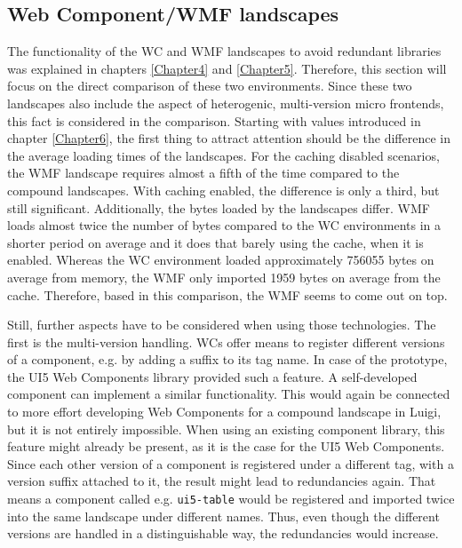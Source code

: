 \subsection{Web Component/WMF landscapes}

The functionality of the WC and WMF landscapes to avoid redundant libraries was explained in chapters \ref{Chapter4} and \ref{Chapter5}. 
Therefore, this section will focus on the direct comparison of these two environments. 
Since these two landscapes also include the aspect of heterogenic, multi-version micro frontends, this fact is considered in the comparison. 
Starting with values introduced in chapter \ref{Chapter6}, the first thing to attract attention should be the difference in the average loading times of the landscapes. 
For the caching disabled scenarios, the WMF landscape requires almost a fifth of the time compared to the compound landscapes. 
With caching enabled, the difference is only a third, but still significant. 
Additionally, the bytes loaded by the landscapes differ. 
WMF loads almost twice the number of bytes compared to the WC environments in a shorter period on average and it does that barely using the cache, when it is enabled. 
Whereas the WC environment loaded approximately 756055 bytes on average from memory, the WMF only imported 1959 bytes on average from the cache. 
Therefore, based in this comparison, the WMF seems to come out on top.

Still, further aspects have to be considered when using those technologies. 
The first is the multi-version handling. 
WCs offer means to register different versions of a component, e.g. by adding a suffix to its tag name. 
In case of the prototype, the UI5 Web Components library provided such a feature. 
A self-developed component can implement a similar functionality. 
This would again be connected to more effort developing Web Components for a compound landscape in Luigi, but it is not entirely impossible.
When using an existing component library, this feature might already be present, as it is the case for the UI5 Web Components. 
Since each other version of a component is registered under a different tag, with a version suffix attached to it, the result might lead to redundancies again. 
That means a component called e.g. \texttt{ui5-table} would be registered and imported twice into the same landscape under different names. 
Thus, even though the different versions are handled in a distinguishable way, the redundancies would increase.

